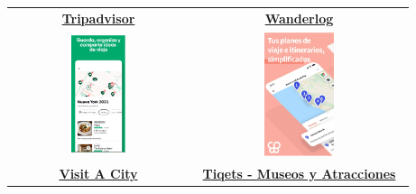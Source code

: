 \newpage

\begin{table}[h!]
	\centering
	\renewcommand{\arraystretch}{1.5} %
	\begin{tabular}{cc}
	\hline
	\href{https://play.google.com/store/apps/details?id=com.tripadvisor.tripadvisor}{\textbf{Tripadvisor}} & \href{https://play.google.com/store/apps/details?id=com.wanderlog.wanderlog}{\textbf{Wanderlog}} \\
	\includegraphics[width=0.32\textwidth]{img/tripadvisor.png} & \includegraphics[width=0.34\textwidth]{img/wanderlog.png} \\
	\hline
	\href{https://play.google.com/store/apps/details?id=com.visitacity}{\textbf{Visit A City}} & \href{https://play.google.com/store/apps/details?id=com.tiqets.tiqetsapp}{\textbf{Tiqets - Museos y Atracciones}} \\

\end{tabular}
\end{table}
